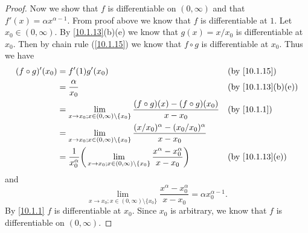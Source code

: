 \begin{proof}
  Now we show that \(f\) is differentiable on \((0, \infty)\) and that \(f'(x) = \alpha x^{\alpha - 1}\).
  From proof above we know that \(f\) is differentiable at \(1\).
  Let \(x_0 \in (0, \infty)\).
  By \cref{10.1.13}(b)(e) we know that \(g(x) = x / x_0\) is differentiable at \(x_0\).
  Then by chain rule (\cref{10.1.15}) we know that \(f \circ g\) is differentiable at \(x_0\).
  Thus we have
  \begin{align*}
    (f \circ g)'(x_0) & = f'(1) g'(x_0)                                                                                                                         &  & \by{10.1.15}                     \\
                      & = \dfrac{\alpha}{x_0}                                                                                                                   &  & \text{(by \cref{10.1.13}(b)(e))} \\
                      & = \lim_{x \to x_0 ; x \in (0, \infty) \setminus \{x_0\}} \dfrac{(f \circ g)(x) - (f \circ g)(x_0)}{x - x_0}                             &  & \by{10.1.1}                      \\
                      & = \lim_{x \to x_0 ; x \in (0, \infty) \setminus \{x_0\}} \dfrac{(x / x_0)^{\alpha} - (x_0 / x_0)^{\alpha}}{x - x_0}                                                           \\
                      & = \dfrac{1}{x_0^{\alpha}} \bigg(\lim_{x \to x_0 ; x \in (0, \infty) \setminus \{x_0\}} \dfrac{x^{\alpha} - x_0^{\alpha}}{x - x_0}\bigg) &  & \text{(by \cref{10.1.13}(e))}
  \end{align*}
  and
  \[
    \lim_{x \to x_0 ; x \in (0, \infty) \setminus \{x_0\}} \dfrac{x^{\alpha} - x_0^{\alpha}}{x - x_0} = \alpha x_0^{\alpha - 1}.
  \]
  By \cref{10.1.1} \(f\) is differentiable at \(x_0\).
  Since \(x_0\) is arbitrary, we know that \(f\) is differentiable on \((0, \infty)\).
\end{proof}